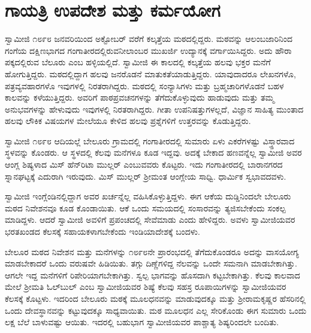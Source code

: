 
\chapter{ಗಾಯತ್ರಿ ಉಪದೇಶ ಮತ್ತು ಕರ್ಮಯೋಗ}

 ಸ್ವಾಮೀಜಿ ೧೮೯೮ ಜನವರಿಯಿಂದ ಅಕ್ಟೋಬರ್ ವರೆಗೆ ಕಲ್ಕತ್ತೆಯ ಮಠದಲ್ಲಿದ್ದರು. ಮಠವನ್ನು ಆಲಂಬಜಾರಿನಿಂದ ಗಂಗೆಯ ದಕ್ಷಿಣಭಾಗದ ಗಂಗಾತೀರದಲ್ಲಿರುವ\break ನೀಲಾಂಬರ ಮುಖರ್ಜಿ ಉದ್ಯಾನಕ್ಕೆ ವರ್ಗಾಯಿಸಿದ್ದರು. ಅದು ಹೌರಾ ಪಕ್ಕದಲ್ಲಿರುವ ಬೆಲೂರು ಎಂಬ ಹಳ್ಳಿಯಲ್ಲಿದೆ. ಸ್ವಾಮೀಜಿ ಈ ಕಾಲದಲ್ಲಿ ಕಲ್ಕತ್ತೆಯ ಹಲವು ಭಕ್ತರ ಮನೆಗೆ ಹೋಗುತ್ತಿದ್ದರು. ಮಠದಲ್ಲಿದ್ದಾಗ ಹಲವು ಜನರೊಡನೆ ಮಾತುಕತೆಯಾಡುತ್ತಿದ್ದರು. ಯಾವುದಾದರೂ ಲೇಖನಗಳೊ, ಪತ್ರವ್ಯವಹಾರಗಳೊ ಇವುಗಳಲ್ಲಿ ನಿರತರಾಗಿದ್ದರು. ಮಠದಲ್ಲಿ ಸಂನ್ಯಾಸಿಗಳು ಮತ್ತು ಬ್ರಹ್ಮಚಾರಿಗಳೊಡನೆ ಬಹಳ ಕಾಲವನ್ನು ಕಳೆಯುತ್ತಿದ್ದರು. ಅವರಿಗೆ ಪಾಠಪ್ರವಚನಗಳನ್ನು ತೆಗೆದುಕೊಳ್ಳುವುದು ಹಾಡುವುದು ಮತ್ತು ತಮ್ಮ ಅನುಭವಗಳನ್ನು ಹೇಳುವುದು ಇವುಗಳಲ್ಲಿ ನಿರತರಾಗಿದ್ದರು. ಗೀತಾ ಉಪನಿಷತ್ತುಗಳಲ್ಲದೆ, ವಿಜ್ಞಾನ ಸಾಹಿತ್ಯ ಮುಂತಾದ ಹಲವು ಲೌಕಿಕ ವಿಷಯಗಳ ಮೇಲೆಯೂ ಕೇಳಿದ ಹಲವು ಪ್ರಶ್ನೆಗಳಿಗೆ ಉತ್ತರವನ್ನು ಕೊಡುತ್ತಿದ್ದರು. 

 ಸ್ವಾಮೀಜಿ ೧೮೯೮ ಆದಿಯಲ್ಲೆ ಬೇಲೂರು ಗ್ರಾಮದಲ್ಲಿ ಗಂಗಾತೀರದಲ್ಲಿ ಸುಮಾರು ಏಳು ಎಕರೆಗಳಷ್ಟು ವಿಸ್ತ್ತಾರವಾದ ಸ್ಥಳವನ್ನು ಕೊಂಡರು. ಆ ಸ್ಥಳದಲ್ಲಿ ಕೆಲವು ಮನೆಗಳೂ ಕೂಡ ಇದ್ದವು. ಅದಕ್ಕೆ ಬೇಕಾದ ಹಣವನ್ನೆಲ್ಲ ಸ್ವಾಮೀಜಿ ಅವರ ಆಂಗ್ಲ ಶಿಷ್ಯಳಾದ ಮಿಸ್ ಹೆನ್‍ರಿಟಾ ಮುಲ್ಲರ್ ಎಂಬುವವರು ಕೊಟ್ಟರು. ಇದು ಗಂಗಾತೀರದಲ್ಲಿ ಬಾರಾನಗರದ ಸ್ನಾನಘಟ್ಟಕ್ಕೆ ಎದುರಾಗಿ ಇರುವುದು. ಮಿಸ್ ಮುಲ್ಲರ್ ಶ‍್ರೀಮಂತ ಆಂಗ್ಲೇಯ ಸಾಧ್ವಿ. ಧಾರ್ಮಿಕ ಸ್ವಭಾವದವಳು. 

 ಸ್ವಾಮೀಜಿ ಇಂಗ್ಲೆಂಡಿನಲ್ಲಿದ್ದಾಗ ಅವರ ಖರ್ಚನ್ನೆಲ್ಲ ವಹಿಸಿಕೊಳ್ಳುತ್ತಿದ್ದಳು. ಈಗ ಆಕೆಯ ದುಡ್ಡಿನಿಂದಲೇ‌ ಬೇಲೂರು ಮಠದ ನಿವೇಶನವೂ ಕೂಡ ಕೊಂಡಾಯಿತು. ಆಕೆ ಒಂದು ಸಮಯದಲ್ಲಿ ಸಂಸಾರವನ್ನು ತ್ಯಜಿಸಬೇಕೆಂದು ಸಂಕಲ್ಪ ಮಾಡಿದ್ದಳು. ಆದರೆ ಸ್ವಾಮೀಜಿ ಅವಳಿಗೆ ಪ್ರಪಂಚದಲ್ಲಿ ಸೇವೆಮಾಡು ಎಂದು ಹೇಳಿದ್ದರು. ಅವಳು ಸ್ವಾಮೀಜಿಯವರ ಭರತಖಂಡದ ಕೆಲಸಕ್ಕೆ ಸಹಾಯಕಳಾಗಬೇಕೆಂದು ಇಂಡಿಯಾದೇಶಕ್ಕೆ ಬಂದಳು. 

 ಬೇಲೂರ ಮಠದ ನಿವೇಶನ ಮತ್ತು ಮನೆಗಳನ್ನು ೧೮೯೮ನೇ ಪ್ರಾರಂಭದಲ್ಲಿ ತೆಗೆದುಕೊಂಡರೂ ಅದನ್ನು ವಾಸಯೋಗ್ಯ ಮಾಡಬೇಕಾದರೆ ಒಂದು ವರುಷವೇ ಹಿಡಿಯಿತು. ತಗ್ಗು ದಿಣ್ಣೆಗಳಿದ್ದ ನೆಲವನ್ನು ಒಂದೇ ಸಮನಾಗಿ ಮಾಡಬೇಕಾಗಿತ್ತು. ಆಗಲೇ ಇದ್ದ ಮನೆಗಳಿಗೆ ರಿಪೇರಿಯಾಗಬೇಕಾಗಿತ್ತು. ಸ್ವಲ್ಪ ಭಾಗವನ್ನು ಹೊಸದಾಗಿ ಕಟ್ಟಬೇಕಾಗಿತ್ತು. ಕೆಲವು ಕಾಲವಾದ ಮೇಲೆ ಶ‍್ರೀಮತಿ ಓಲ್‍ಬುಲ್ ಎಂಬ ಸ್ವಾಮೀಜಿಯವರ ಶಿಷ್ಯೆ ಕೆಲವು ಸಹಸ್ರ ರೂಪಾಯಿಗಳನ್ನು ಸ್ವಾಮೀಜಿಯವರ ಕೆಲಸಕ್ಕೆ ಕೊಟ್ಟಳು. ಇದರಿಂದ ಬೇಲೂರು ಮಠಕ್ಕೆ ಮೂಲಧನವನ್ನು ಮಾಡುವುದಕ್ಕೂ ಮತ್ತು ಶ‍್ರೀರಾಮಕೃಷ್ಣರ ಹೆಸರಿನಲ್ಲಿ ಒಂದು ದೇವಸ್ಥಾನವನ್ನು ಕಟ್ಟುವುದಕ್ಕೂ ಸಾಧ್ಯವಾಯಿತು. ಮಠ ಮೂಲಧನ ಎಲ್ಲ ಸೇರಿಕೊಂಡು ಈಗ ಸುಮಾರು ಒಂದು ಲಕ್ಷ ಬೆಲೆ ಬಾಳುವಷ್ಟು ಆಯಿತು. ಇದರಲ್ಲಿ ಬಹುಭಾಗ ಸ್ವಾಮೀಜಿಯವರ ಪಾಶ್ಚಾತ್ಯ ಶಿಷ್ಯರಿಂದಲೇ ಬಂದಿತು. 

